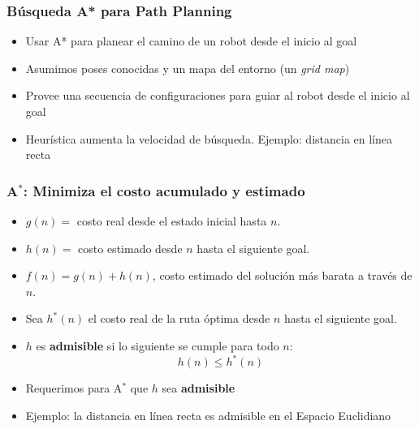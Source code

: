 \begin{frame}
    \frametitle{Búsqueda A* para Path Planning}
    
    \begin{itemize}
        \item Usar A* para planear el camino de un robot desde el inicio al goal
        \item Asumimos poses conocidas y un mapa del entorno (un \emph{grid map})
        \item Provee una secuencia de configuraciones para guiar al robot desde el inicio al goal
        \item Heurística aumenta la velocidad de búsqueda. Ejemplo: distancia en línea recta
    \end{itemize}

\end{frame}


\begin{frame}
    \frametitle{A$^{*}$: Minimiza el costo acumulado y estimado}
    
    \begin{itemize}
        \item $g(n) =$ costo real desde el estado inicial hasta $n$.
        \item $h(n) =$ costo estimado desde $n$ hasta el siguiente goal.
        \item $f(n) = g(n) + h(n)$, costo estimado del solución más barata a través de $n$.
        \item Sea $h^{*}(n)$ el costo real de la ruta óptima desde $n$ hasta el siguiente goal.
        \item $h$ es \textbf{admisible} si lo siguiente se cumple para todo $n$:
        \begin{equation*}
            h(n) \leq h^{*}(n)
        \end{equation*}
        \item Requerimos para A$^{*}$ que $h$ sea \textbf{admisible}
        \item Ejemplo: la distancia en línea recta es admisible en el Espacio Euclidiano
    \end{itemize}
    
\end{frame}

